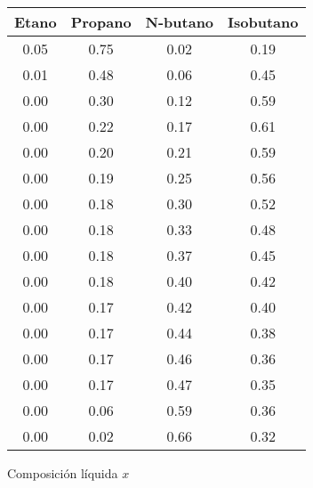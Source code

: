 \begin{figure}[H]
    \centering
    \caption{Composición líquida $x$}
    \small
    \begin{tabular}{|c|c|c|c|}
        \hline
        \textbf{Etano} & \textbf{Propano} & \textbf{N-butano} & \textbf{Isobutano} \\
        \hline
        0.05           & 0.75             & 0.02              & 0.19               \\
        \hline
        0.01           & 0.48             & 0.06              & 0.45               \\
        \hline
        0.00           & 0.30             & 0.12              & 0.59               \\
        \hline
        0.00           & 0.22             & 0.17              & 0.61               \\
        \hline
        0.00           & 0.20             & 0.21              & 0.59               \\
        \hline
        0.00           & 0.19             & 0.25              & 0.56               \\
        \hline
        0.00           & 0.18             & 0.30              & 0.52               \\
        \hline
        0.00           & 0.18             & 0.33              & 0.48               \\
        \hline
        0.00           & 0.18             & 0.37              & 0.45               \\
        \hline
        0.00           & 0.18             & 0.40              & 0.42               \\
        \hline
        0.00           & 0.17             & 0.42              & 0.40               \\
        \hline
        0.00           & 0.17             & 0.44              & 0.38               \\
        \hline
        0.00           & 0.17             & 0.46              & 0.36               \\
        \hline
        0.00           & 0.17             & 0.47              & 0.35               \\
        \hline
        0.00           & 0.06             & 0.59              & 0.36               \\
        \hline
        0.00           & 0.02             & 0.66              & 0.32               \\
        \hline

\end{tabular}
\end{figure}
